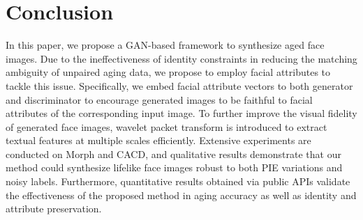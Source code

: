 \documentclass[10pt,twocolumn,letterpaper]{article}
\begin{document}
\section{Conclusion}
In this paper, we propose a GAN-based framework to synthesize aged face images. Due to the ineffectiveness of identity constraints in reducing the matching ambiguity of unpaired aging data, we propose to employ facial attributes to tackle this issue. 
Specifically, we embed facial attribute vectors to both generator and discriminator to encourage generated images to be faithful to facial attributes of the corresponding input image. 
To further improve the visual fidelity of generated face images, wavelet packet transform is introduced to extract textual features at multiple scales efficiently. 
Extensive experiments are conducted on Morph and CACD, and qualitative results demonstrate that our method could synthesize lifelike face images robust to both PIE variations and noisy labels. 
Furthermore, quantitative results obtained via public APIs validate the effectiveness of the proposed method in aging accuracy as well as identity and attribute preservation.

{\small


}
\end{document}
